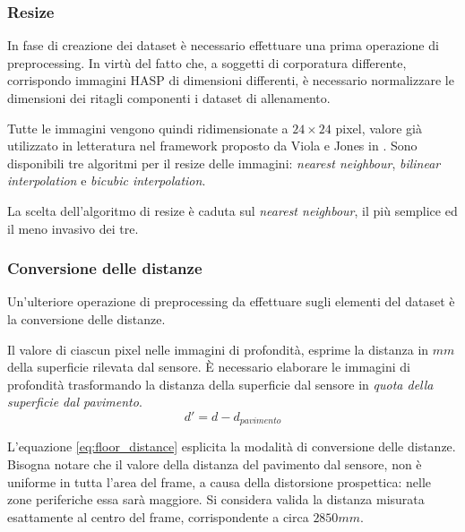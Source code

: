             \subsubsection{Resize}
                In fase di creazione dei dataset è necessario effettuare una prima operazione di preprocessing.
                In virtù del fatto che, a soggetti di corporatura differente, corrispondo immagini HASP di dimensioni differenti, è necessario normalizzare le dimensioni dei ritagli componenti i dataset di allenamento.
                
                Tutte le immagini vengono quindi ridimensionate a $24 \times 24$ pixel, valore già utilizzato in letteratura nel framework proposto da Viola e Jones in \cite{Viola04}.
                Sono disponibili tre algoritmi per il resize delle immagini: \emph{nearest neighbour}, \emph{bilinear interpolation} e \emph{bicubic interpolation}.

                La scelta dell'algoritmo di resize è caduta sul \emph{nearest neighbour}, il più semplice ed il meno invasivo dei tre.

            \subsubsection{Conversione delle distanze}
                Un'ulteriore operazione di preprocessing da effettuare sugli elementi del dataset è la conversione delle distanze.
                
                Il valore di ciascun pixel nelle immagini di profondità, esprime la distanza in $mm$ della superficie rilevata dal sensore.
                È necessario elaborare le immagini di profondità trasformando la distanza della superficie dal sensore in \emph{quota della superficie dal pavimento}.
                \begin{equation}
                    \label{eq:floor_distance}
                    d' = d - d_{pavimento}
                \end{equation}

                L'equazione \ref{eq:floor_distance} esplicita la modalità di conversione delle distanze.
                Bisogna notare che il valore della distanza del pavimento dal sensore, non è uniforme in tutta l'area del frame, a causa della distorsione prospettica: nelle zone periferiche essa sarà maggiore.
                Si considera valida la distanza misurata esattamente al centro del frame, corrispondente a circa $2850mm$.

